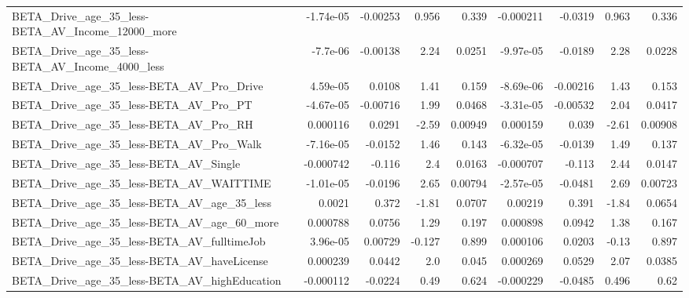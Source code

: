 \begin{tabular}{lrrrrrrrr}
BETA\_Drive\_age\_35\_less-BETA\_AV\_Income\_12000\_more   &   -1.74e-05 &     -0.00253 &     0.956 &    0.339 &  -0.000211 &     -0.0319 &        0.963 &         0.336 \\
BETA\_Drive\_age\_35\_less-BETA\_AV\_Income\_4000\_less    &    -7.7e-06 &     -0.00138 &      2.24 &   0.0251 &  -9.97e-05 &     -0.0189 &         2.28 &        0.0228 \\
BETA\_Drive\_age\_35\_less-BETA\_AV\_Pro\_Drive           &    4.59e-05 &       0.0108 &      1.41 &    0.159 &  -8.69e-06 &    -0.00216 &         1.43 &         0.153 \\
BETA\_Drive\_age\_35\_less-BETA\_AV\_Pro\_PT              &   -4.67e-05 &     -0.00716 &      1.99 &   0.0468 &  -3.31e-05 &    -0.00532 &         2.04 &        0.0417 \\
BETA\_Drive\_age\_35\_less-BETA\_AV\_Pro\_RH              &    0.000116 &       0.0291 &     -2.59 &  0.00949 &   0.000159 &       0.039 &        -2.61 &       0.00908 \\
BETA\_Drive\_age\_35\_less-BETA\_AV\_Pro\_Walk            &   -7.16e-05 &      -0.0152 &      1.46 &    0.143 &  -6.32e-05 &     -0.0139 &         1.49 &         0.137 \\
BETA\_Drive\_age\_35\_less-BETA\_AV\_Single              &   -0.000742 &       -0.116 &       2.4 &   0.0163 &  -0.000707 &      -0.113 &         2.44 &        0.0147 \\
BETA\_Drive\_age\_35\_less-BETA\_AV\_WAITTIME            &   -1.01e-05 &      -0.0196 &      2.65 &  0.00794 &  -2.57e-05 &     -0.0481 &         2.69 &       0.00723 \\
BETA\_Drive\_age\_35\_less-BETA\_AV\_age\_35\_less         &      0.0021 &        0.372 &     -1.81 &   0.0707 &    0.00219 &       0.391 &        -1.84 &        0.0654 \\
BETA\_Drive\_age\_35\_less-BETA\_AV\_age\_60\_more         &    0.000788 &       0.0756 &      1.29 &    0.197 &   0.000898 &      0.0942 &         1.38 &         0.167 \\
BETA\_Drive\_age\_35\_less-BETA\_AV\_fulltimeJob         &    3.96e-05 &      0.00729 &    -0.127 &    0.899 &   0.000106 &      0.0203 &        -0.13 &         0.897 \\
BETA\_Drive\_age\_35\_less-BETA\_AV\_haveLicense         &    0.000239 &       0.0442 &       2.0 &    0.045 &   0.000269 &      0.0529 &         2.07 &        0.0385 \\
BETA\_Drive\_age\_35\_less-BETA\_AV\_highEducation       &   -0.000112 &      -0.0224 &      0.49 &    0.624 &  -0.000229 &     -0.0485 &        0.496 &          0.62 \\

\end{tabular}
